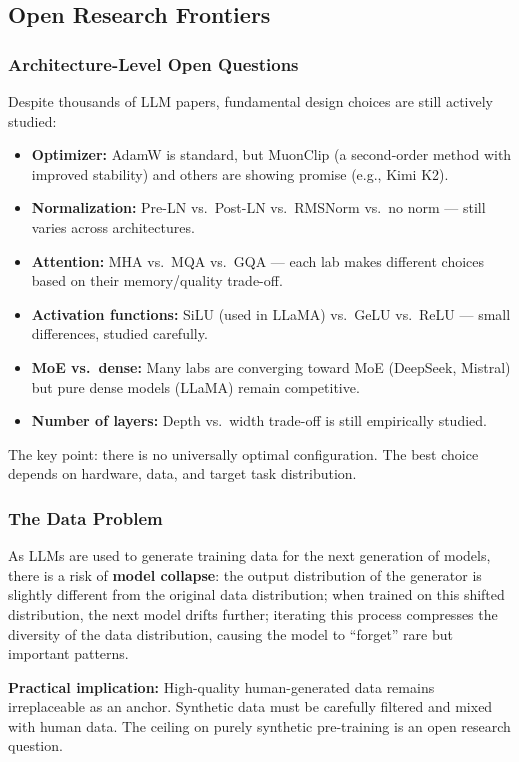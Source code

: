 \documentclass[11pt, a4paper]{article}
\begin{document}
\subsection{Open Research Frontiers}

\subsubsection{Architecture-Level Open Questions}

\begin{tealbox}
Despite thousands of LLM papers, fundamental design choices are still actively studied:
\begin{itemize}[leftmargin=1.5em]
  \item \textbf{Optimizer:} AdamW is standard, but MuonClip (a second-order method with improved stability) and others are showing promise (e.g., Kimi K2).
  \item \textbf{Normalization:} Pre-LN vs.\ Post-LN vs.\ RMSNorm vs.\ no norm --- still varies across architectures.
  \item \textbf{Attention:} MHA vs.\ MQA vs.\ GQA --- each lab makes different choices based on their memory/quality trade-off.
  \item \textbf{Activation functions:} SiLU (used in LLaMA) vs.\ GeLU vs.\ ReLU --- small differences, studied carefully.
  \item \textbf{MoE vs.\ dense:} Many labs are converging toward MoE (DeepSeek, Mistral) but pure dense models (LLaMA) remain competitive.
  \item \textbf{Number of layers:} Depth vs.\ width trade-off is still empirically studied.
\end{itemize}
The key point: there is no universally optimal configuration. The best choice depends on hardware, data, and target task distribution.
\end{tealbox}

\subsubsection{The Data Problem}

\begin{warnbox}
As LLMs are used to generate training data for the next generation of models, there is a risk of \textbf{model collapse}: the output distribution of the generator is slightly different from the original data distribution; when trained on this shifted distribution, the next model drifts further; iterating this process compresses the diversity of the data distribution, causing the model to ``forget'' rare but important patterns.

\textbf{Practical implication:} High-quality human-generated data remains irreplaceable as an anchor. Synthetic data must be carefully filtered and mixed with human data. The ceiling on purely synthetic pre-training is an open research question.
\end{warnbox}
\end{document}

